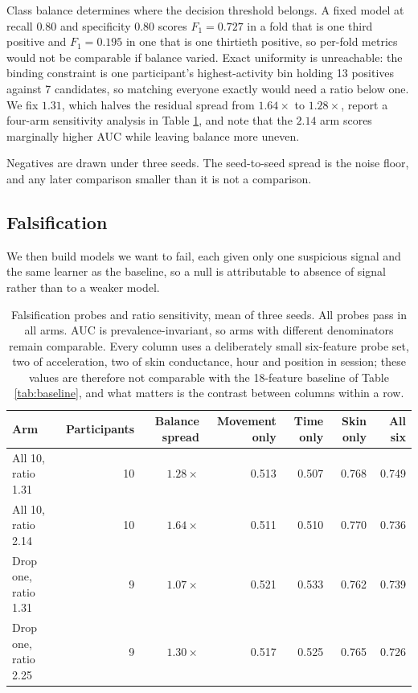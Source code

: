 \documentclass{article}
\begin{document}
Class balance determines where the decision threshold belongs. A fixed model at
recall $0.80$ and specificity $0.80$ scores $F_1 = 0.727$ in a fold that is one
third positive and $F_1 = 0.195$ in one that is one thirtieth positive, so
per-fold metrics would not be comparable if balance varied. Exact uniformity is
unreachable: the binding constraint is one participant's highest-activity bin
holding 13 positives against 7 candidates, so matching everyone exactly would
need a ratio below one. We fix $1.31$, which halves the residual spread from
$1.64\times$ to $1.28\times$, report a four-arm sensitivity analysis in Table
\ref{tab:sens}, and note that the $2.14$ arm scores marginally higher AUC while
leaving balance more uneven.

Negatives are drawn under three seeds. The seed-to-seed spread is the noise
floor, and any later comparison smaller than it is not a comparison.

\subsection{Falsification}

We then build models we want to fail, each given only one suspicious signal and
the same learner as the baseline, so a null is attributable to absence of
signal rather than to a weaker model.

\begin{table}[t]
\caption{Falsification probes and ratio sensitivity, mean of three seeds. All
probes pass in all arms. AUC is prevalence-invariant, so arms with different
denominators remain comparable. Every column uses a deliberately small
six-feature probe set, two of acceleration, two of skin conductance, hour and
position in session; these values are therefore not comparable with the
18-feature baseline of Table \ref{tab:baseline}, and what matters is the
contrast between columns within a row.}
\label{tab:sens}
\centering
\small
\setlength{\tabcolsep}{4pt}
\begin{tabular}{lrrrrrr}
\toprule
Arm & Participants & Balance spread & Movement only & Time only & Skin only & All six \\
\midrule
All 10, ratio 1.31   & 10 & $1.28\times$ & 0.513 & 0.507 & 0.768 & 0.749 \\
All 10, ratio 2.14   & 10 & $1.64\times$ & 0.511 & 0.510 & 0.770 & 0.736 \\
Drop one, ratio 1.31 &  9 & $1.07\times$ & 0.521 & 0.533 & 0.762 & 0.739 \\
Drop one, ratio 2.25 &  9 & $1.30\times$ & 0.517 & 0.525 & 0.765 & 0.726 \\
\bottomrule
\end{tabular}
\end{table}
\end{document}
